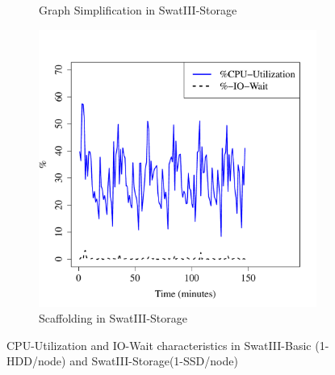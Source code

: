 \documentclass[conference]{IEEEtran}
\begin{document}
\begin{figure}[htb]
\begin{subfigure}[b]{0.3\textwidth}
                \caption{Graph Simplification in SwatIII-Storage}
                \label{fig:ECCPUSSD}
        \end{subfigure}
        \begin{subfigure}[b]{0.3\textwidth}
                \includegraphics[width=\textwidth]{Figure/SystemData/Plots/SCFCPUSSD.pdf}
                \caption{Scaffolding in SwatIII-Storage}
                \label{fig:SCFCPUSSD}
        \end{subfigure}
        \caption{CPU-Utilization and IO-Wait characteristics in SwatIII-Basic (1-HDD/node) and SwatIII-Storage(1-SSD/node)}\label{fig:HddSsdCPU}
\end{figure}
\end{document}
